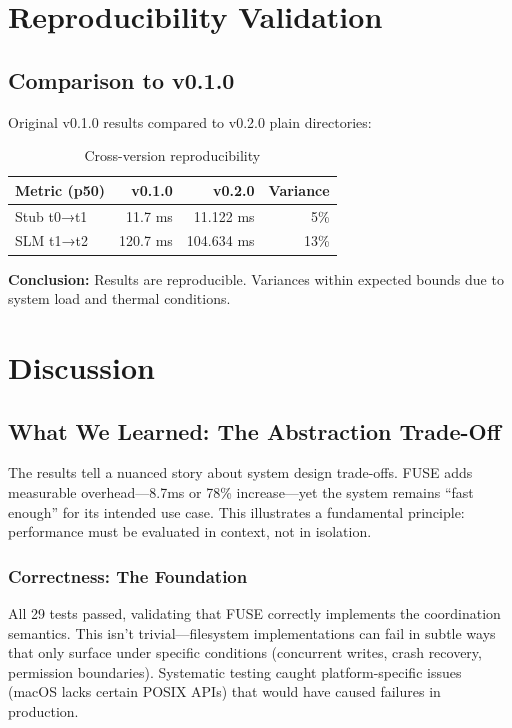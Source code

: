\documentclass[11pt]{article}
\begin{document}
\section{Reproducibility Validation}

\subsection{Comparison to v0.1.0}

Original v0.1.0 results compared to v0.2.0 plain directories:

\begin{table}[h]
\centering
\begin{tabular}{lrrr}
\toprule
\textbf{Metric (p50)} & \textbf{v0.1.0} & \textbf{v0.2.0} & \textbf{Variance} \\
\midrule
Stub t0→t1 & 11.7 ms & 11.122 ms & 5\% \\
SLM t1→t2 & 120.7 ms & 104.634 ms & 13\% \\
\bottomrule
\end{tabular}
\caption{Cross-version reproducibility}
\end{table}

\textbf{Conclusion:} Results are reproducible. Variances within expected bounds due to system load and thermal conditions.

\section{Discussion}

\subsection{What We Learned: The Abstraction Trade-Off}

The results tell a nuanced story about system design trade-offs. FUSE adds measurable overhead---8.7ms or 78\% increase---yet the system remains ``fast enough'' for its intended use case. This illustrates a fundamental principle: performance must be evaluated in context, not in isolation.

\subsubsection{Correctness: The Foundation}

All 29 tests passed, validating that FUSE correctly implements the coordination semantics. This isn't trivial---filesystem implementations can fail in subtle ways that only surface under specific conditions (concurrent writes, crash recovery, permission boundaries). Systematic testing caught platform-specific issues (macOS lacks certain POSIX APIs) that would have caused failures in production.
\end{document}
